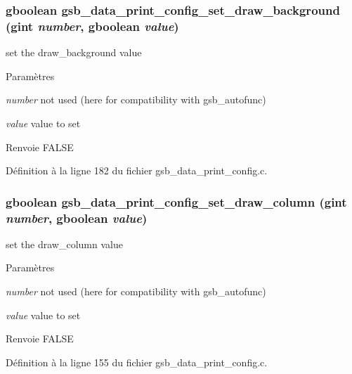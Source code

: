 \subsubsection[{gsb\_\-data\_\-print\_\-config\_\-set\_\-draw\_\-background}]{\setlength{\rightskip}{0pt plus 5cm}gboolean gsb\_\-data\_\-print\_\-config\_\-set\_\-draw\_\-background (gint {\em number}, \/  gboolean {\em value})}\label{gsb__data__print__config_8c_ad06a44fa956ad56ee3ecbb4834c541c2}
set the draw\_\-background value


\begin{DoxyParams}{Paramètres}
\item[{\em number}]not used (here for compatibility with gsb\_\-autofunc) \item[{\em value}]value to set\end{DoxyParams}
\begin{DoxyReturn}{Renvoie}
FALSE 
\end{DoxyReturn}


Définition à la ligne 182 du fichier gsb\_\-data\_\-print\_\-config.c.

\subsubsection[{gsb\_\-data\_\-print\_\-config\_\-set\_\-draw\_\-column}]{\setlength{\rightskip}{0pt plus 5cm}gboolean gsb\_\-data\_\-print\_\-config\_\-set\_\-draw\_\-column (gint {\em number}, \/  gboolean {\em value})}\label{gsb__data__print__config_8c_aa24596906e01248f337b10c9ef207a66}
set the draw\_\-column value


\begin{DoxyParams}{Paramètres}
\item[{\em number}]not used (here for compatibility with gsb\_\-autofunc) \item[{\em value}]value to set\end{DoxyParams}
\begin{DoxyReturn}{Renvoie}
FALSE 
\end{DoxyReturn}


Définition à la ligne 155 du fichier gsb\_\-data\_\-print\_\-config.c.


